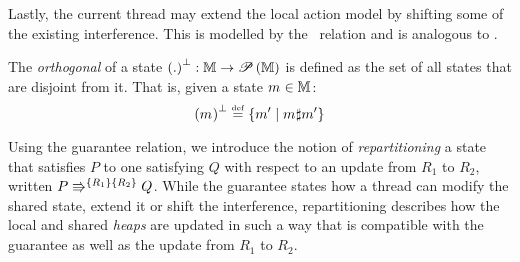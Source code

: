 Lastly, the current thread may extend the local action model by shifting some of the existing interference. This is modelled by the \shiftG\ relation and is analogous to \shiftR.
%
%
\begin{definition}[Orthogonal]\label{def:orthogonal}
The \emph{orthogonal} of a state  $\heapSize{.}: \Heaps \rightarrow \pset{\Heaps}$ is defined as the set of all states that are disjoint from it. That is, given a state $\h{} \in \Heaps$:
%
\[
	\heapSize{\h{}} \eqdef \left\{ \h{}' \mid \h{} \disjoint \h{}' \right\}
\]
%
\end{definition}
%
Using the guarantee relation, we introduce the notion of \emph{repartitioning} a state that satisfies $P$ to one satisfying $Q$ with respect to an update from $R_1$ to $R_2$, written $\repartitions{P}{Q}{R_1}{R_2}$. While the guarantee states how a thread can modify the shared state, extend it or shift the interference, repartitioning describes how the local and shared \emph{heaps} are updated in such a way that is compatible with the guarantee as well as the update from $R_1$ to $R_2$.
%
